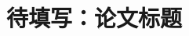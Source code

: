 
\title{待填写：论文标题}

\newcommand{\PaperKeywords}{待填写\quad 待填写\quad 待填写\quad 待填写}

\newcommand{\PaperOfficialYear}{2025}
\newcommand{\PaperOfficialFrozen}{false}
